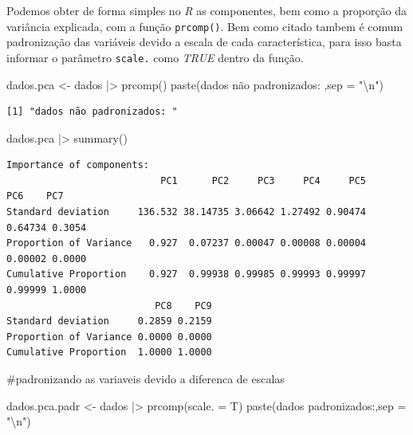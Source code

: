 \documentclass[
  letterpaper,
  DIV=11,
  numbers=noendperiod]{scrreprt}
\newenvironment{Shaded}{\begin{snugshade}}{\end{snugshade}}
\newcommand{\AttributeTok}[1]{\textcolor[rgb]{0.40,0.45,0.13}{#1}}
\newcommand{\CommentTok}[1]{\textcolor[rgb]{0.37,0.37,0.37}{#1}}
\newcommand{\FunctionTok}[1]{\textcolor[rgb]{0.28,0.35,0.67}{#1}}
\newcommand{\NormalTok}[1]{\textcolor[rgb]{0.00,0.23,0.31}{#1}}
\newcommand{\OtherTok}[1]{\textcolor[rgb]{0.00,0.23,0.31}{#1}}
\newcommand{\SpecialCharTok}[1]{\textcolor[rgb]{0.37,0.37,0.37}{#1}}
\newcommand{\StringTok}[1]{\textcolor[rgb]{0.13,0.47,0.30}{#1}}
\begin{document}
Podemos obter de forma simples no \emph{R} as componentes, bem como a
proporção da variância explicada, com a função \texttt{prcomp()}. Bem
como citado tambem é comum padronização das variáveis devido a escala de
cada característica, para isso basta informar o parâmetro
\texttt{scale.} como \emph{TRUE} dentro da função.

\begin{Shaded}
\begin{Highlighting}[]
\NormalTok{dados.pca }\OtherTok{\textless{}{-}}\NormalTok{ dados }\SpecialCharTok{|\textgreater{}} 
  \FunctionTok{prcomp}\NormalTok{()}
\FunctionTok{paste}\NormalTok{(}\StringTok{\textquotesingle{}dados não padronizados: \textquotesingle{}}\NormalTok{,}\AttributeTok{sep =} \StringTok{"}\SpecialCharTok{\textbackslash{}n}\StringTok{"}\NormalTok{)}
\end{Highlighting}
\end{Shaded}

\begin{verbatim}
[1] "dados não padronizados: "
\end{verbatim}

\begin{Shaded}
\begin{Highlighting}[]
\NormalTok{dados.pca }\SpecialCharTok{|\textgreater{}} \FunctionTok{summary}\NormalTok{()}
\end{Highlighting}
\end{Shaded}

\begin{verbatim}
Importance of components:
                           PC1      PC2     PC3     PC4     PC5     PC6    PC7
Standard deviation     136.532 38.14735 3.06642 1.27492 0.90474 0.64734 0.3054
Proportion of Variance   0.927  0.07237 0.00047 0.00008 0.00004 0.00002 0.0000
Cumulative Proportion    0.927  0.99938 0.99985 0.99993 0.99997 0.99999 1.0000
                          PC8    PC9
Standard deviation     0.2859 0.2159
Proportion of Variance 0.0000 0.0000
Cumulative Proportion  1.0000 1.0000
\end{verbatim}

\begin{Shaded}
\begin{Highlighting}[]
\CommentTok{\#padronizando as variaveis devido a diferenca de escalas}

\NormalTok{dados.pca.padr }\OtherTok{\textless{}{-}}\NormalTok{ dados }\SpecialCharTok{|\textgreater{}}
  \FunctionTok{prcomp}\NormalTok{(}\AttributeTok{scale. =}\NormalTok{ T)}
\FunctionTok{paste}\NormalTok{(}\StringTok{\textquotesingle{}dados padronizados:\textquotesingle{}}\NormalTok{,}\AttributeTok{sep =} \StringTok{"}\SpecialCharTok{\textbackslash{}n}\StringTok{"}\NormalTok{)}
\end{Highlighting}
\end{Shaded}
\end{document}
